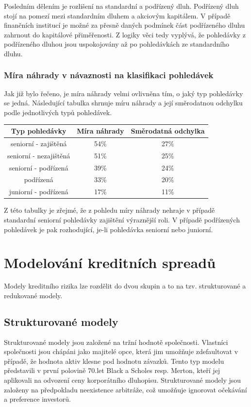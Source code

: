 \documentclass[a4paper]{book}
\begin{document}
Posledním dělením je rozlišení na standardní a podřízený dluh. Podřízený dluh stojí na pomezí mezi standardním dluhem a akciovým kapitálem. V případě finančních institucí je možné za přesně daných podmínek část podřízeného dluhu zahrnout do kapitálové přiměřenosti. Z logiky věci tedy vyplývá, že pohledávky z podřízeného dluhou jsou uspokojovány až po pohledávkách ze standardního dluhu.

\subsubsection{Míra náhrady v návaznosti na klasifikaci pohledávek}

Jak již bylo řečeno, je míra náhrady velmi ovlivněna tím, o jaký typ pohledávky se jedná. Následující tabulka shrnuje míru náhrady a její směrodatnou odchylku podle jednotlivých typů pohledávek.
\begin{center}
\begin{tabular}{c c c}
\textbf{Typ pohledávky} & \textbf{Míra náhrady} & \textbf{Směrodatná odchylka}\\
\hline
seniorní - zajištěná & 54\% & 27\% \\
seniorní - nezajištěná & 51\% & 25\% \\
seniorní - podřízená & 39\% & 24\% \\
podřízená & 33\% & 20\% \\
juniorní - podřízená & 17\% & 11\% \\
\end{tabular}
\end{center}
Z této tabulky je zřejmé, že z pohledu míry náhrady nehraje v případě standardní seniorní pohledávky zajištění výraznější roli. V případě podřízených pohledávek je pak rozhodující, je-li pohledávka seniorní nebo juniorní.

\section{Modelování kreditních spreadů}

Modely kreditního rizika lze rozdělit do dvou skupin a to na tzv. strukturované a redukované modely.

\subsection{Strukturované modely}

Strukturované modely jsou založené na tržní hodnotě společnosti. Vlastníci společnosti jsou chápáni jako majitelé opce, která jim umožňuje zdefaultovat v případě, že hodnota aktiv klesne pod hodnotu závazků. Tento typ modelu představili v první polovině 70.let Black a Scholes resp. Merton, kteří jej aplikovali na odvození ceny korporátního dluhopisu. Strukturované modely jsou založeny na předpokladu neexistence arbitráže, což umožňuje ignorovat očekávání a preference investorů.
\end{document}
